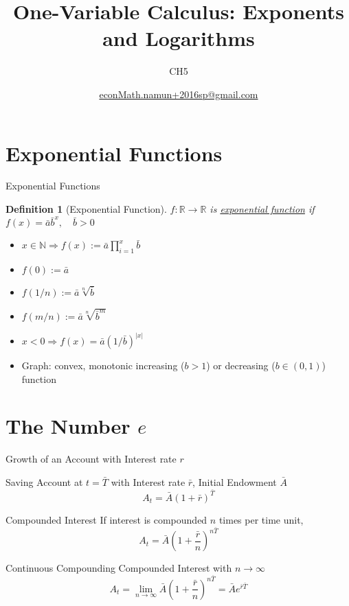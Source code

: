 \documentclass[a4paper,11pt]{article}
\author[조남운]{\url{econMath.namun+2016sp@gmail.com}}
\title{One-Variable Calculus: Exponents and Logarithms}
\subtitle{CH5}
\newtheorem{defn}{Definition}
\begin{document}
	
\maketitle


\section{Exponential Functions} %
\label{sec:exponential_functions}
\begin{frame}[t]{Exponential Functions}
	\begin{defn}
		[Exponential Function]
		$f:\mathbb{R}\rightarrow\mathbb{R}$ is \uline{exponential function} if $f(x)=\bar a \bar b^x,\quad \bar b>0$
	\end{defn}
	\begin{itemize}
		\item $x\in\mathbb{N}\Rightarrow f(x):=\bar a \prod_{i=1}^x \bar b$
		\item $f(0) := \bar a$
		\item $f(1/n):= \bar a \sqrt[n]{\bar b}$
		\item $f(m/n):= \bar a \sqrt[n]{\bar b^m}$
		\item $x<0 \Rightarrow f(x)=\bar a (1/\bar b)^{|x|}$
		\item Graph: convex, monotonic increasing ($b>1$) or decreasing ($b\in(0,1)$) function
	\end{itemize}
\end{frame}

\section{The Number $e$} %
\label{sec:the_number_e}
\begin{frame}[t]{Growth of an Account with Interest rate $r$}
	\begin{block}
		{Saving Account at $t=\bar T$ with Interest rate $\bar r$, Initial Endowment $\bar A$}
		\[
			A_t = \bar A \left(1+\bar r\right)^{\bar T}
		\]
	\end{block}
	\begin{block}
		{Compounded Interest} If interest is compounded $n$ times per time unit, 
		\[
			A_t = \bar A \left(1+\frac{\bar r}{n}\right)^{n\bar T}
		\]
	\end{block}
	\begin{block}
		{Continuous Compounding} Compounded Interest with $n\rightarrow \infty$
		\[
			A_t = \lim_{n\rightarrow \infty}\bar A \left(1+\frac{\bar r}{n}\right)^{n\bar T} = \bar A e^{\bar r\bar T}
		\]
	\end{block}
\end{frame}
\end{document}
